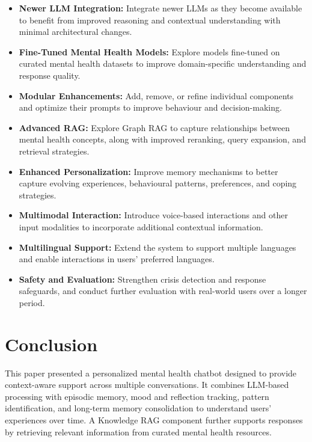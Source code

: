 \documentclass[conference]{IEEEtran}
\begin{document}
\begin{itemize}
    \item \textbf{Newer LLM Integration:} Integrate newer LLMs as they become available to benefit from improved reasoning and contextual understanding with minimal architectural changes.

    \item \textbf{Fine-Tuned Mental Health Models:} Explore models fine-tuned on curated mental health datasets to improve domain-specific understanding and response quality.

    \item \textbf{Modular Enhancements:} Add, remove, or refine individual components and optimize their prompts to improve behaviour and decision-making.

    \item \textbf{Advanced RAG:} Explore Graph RAG to capture relationships between mental health concepts, along with improved reranking, query expansion, and retrieval strategies.

    \item \textbf{Enhanced Personalization:} Improve memory mechanisms to better capture evolving experiences, behavioural patterns, preferences, and coping strategies.

    \item \textbf{Multimodal Interaction:} Introduce voice-based interactions and other input modalities to incorporate additional contextual information.

    \item \textbf{Multilingual Support:} Extend the system to support multiple languages and enable interactions in users' preferred languages.

    \item \textbf{Safety and Evaluation:} Strengthen crisis detection and response safeguards, and conduct further evaluation with real-world users over a longer period.
\end{itemize}

\section{Conclusion}

This paper presented a personalized mental health chatbot designed to provide context-aware support across multiple conversations. It combines LLM-based processing with episodic memory, mood and reflection tracking, pattern identification, and long-term memory consolidation to understand users' experiences over time. A Knowledge RAG component further supports responses by retrieving relevant information from curated mental health resources.
\end{document}
